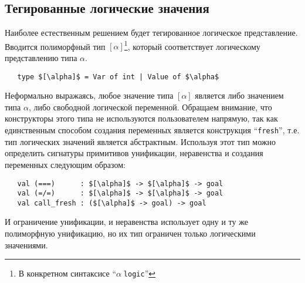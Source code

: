 \subsection{Тегированные логические значения}

Наиболее естественным решением будет тегированное логическое представление.
Вводится полиморфный тип $[\alpha]$\footnote{В конкретном синтаксисе ``$\alpha\;$\lstinline|logic|''}, который соответствует логическому представлению типа $\alpha$.


\begin{lstlisting}
   type $[\alpha]$ = Var of int | Value of $\alpha$
\end{lstlisting}

\noindent Неформально выражаясь, любое значение типа $[\alpha]$ является либо значением типа $\alpha$, либо свободной логической переменной.
Обращаем внимание, что конструкторы этого типа не используются пользователем напрямую, так как единственным способом создания переменных является конструкция \enquote{\lstinline=fresh=}, т.е. тип логических значений является абстрактным.
Используя этот тип можно определить сигнатуры примитивов унификации, неравенства и создания переменных следующим образом:


\begin{lstlisting}
   val (===)      : $[\alpha]$ -> $[\alpha]$ -> goal
   val (=/=)      : $[\alpha]$ -> $[\alpha]$ -> goal
   val call_fresh : ($[\alpha]$ -> goal) -> goal
\end{lstlisting}

\noindent И ограничение унификации, и неравенства использует одну и ту же полиморфную унификацию, но их тип ограничен только логическими значениями.

